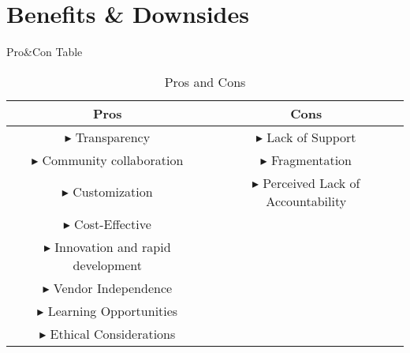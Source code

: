 \section{Benefits \& Downsides}

\begin{frame}{Pro\&Con Table}

\begin{table}[]
    \small
    \centering
    \def\arraystretch{1.1}
    \begin{tabular}{|c|c|}
    \hline
      \cellcolor{green!50}\textbf{Pros} & \cellcolor{red!50}\textbf{Cons} \\
    \hline
       $\blacktriangleright$ Transparency & $\blacktriangleright$ Lack of Support \\
       $\blacktriangleright$ Community collaboration & $\blacktriangleright$ Fragmentation \\
       $\blacktriangleright$ Customization & $\blacktriangleright$ Perceived Lack of Accountability \\
       $\blacktriangleright$ Cost-Effective & \\
       $\blacktriangleright$ Innovation and rapid development & \\
       $\blacktriangleright$ Vendor Independence & \\
       $\blacktriangleright$ Learning Opportunities & \\
        $\blacktriangleright$ Ethical Considerations & \\
    \hline
    \end{tabular}
    \caption{Pros and Cons}
    \label{tab:ProsCons}
\end{table}
    
\end{frame}
